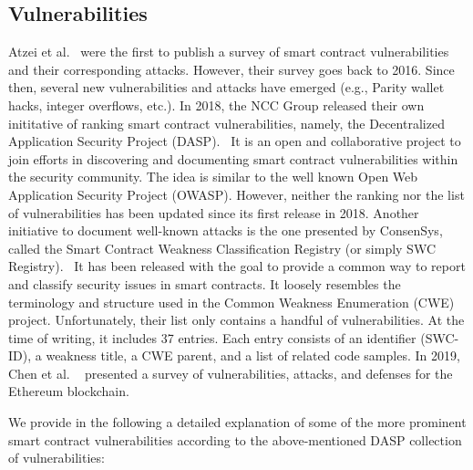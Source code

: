     \subsection{Vulnerabilities}
        Atzei et al.~\cite{atzei2017survey} were the first to publish a survey of smart contract vulnerabilities and their corresponding attacks.
        However, their survey goes back to 2016.
        Since then, several new vulnerabilities and attacks have emerged (e.g., Parity wallet hacks, integer overflows, etc.).
        In 2018, the NCC Group released their own inititative of ranking smart contract vulnerabilities, namely, the Decentralized Application Security Project (DASP).~\cite{dasp}
        It is an open and collaborative project to join efforts in discovering and documenting smart contract vulnerabilities within the security community.
        The idea is similar to the well known Open Web Application Security Project (OWASP).
        However, neither the ranking nor the list of vulnerabilities has been updated since its first release in 2018.
        Another initiative to document well-known attacks is the one presented by ConsenSys, called the Smart Contract Weakness Classification Registry (or simply SWC Registry).~\cite{swcregistry}
        It has been released with the goal to provide a common way to report and classify security issues in smart contracts.
        It loosely resembles the terminology and structure used in the Common Weakness Enumeration (CWE) project.
        Unfortunately, their list only contains a handful of vulnerabilities.
        At the time of writing, it includes 37 entries.
        Each entry consists of an identifier (SWC-ID), a weakness title, a CWE parent, and a list of related code samples.
        In 2019, Chen et al. ~\cite{chen2020survey} presented a survey of vulnerabilities, attacks, and defenses for the Ethereum blockchain.

        We provide in the following a detailed explanation of some of the more prominent smart contract vulnerabilities according to the above-mentioned DASP collection of vulnerabilities:

